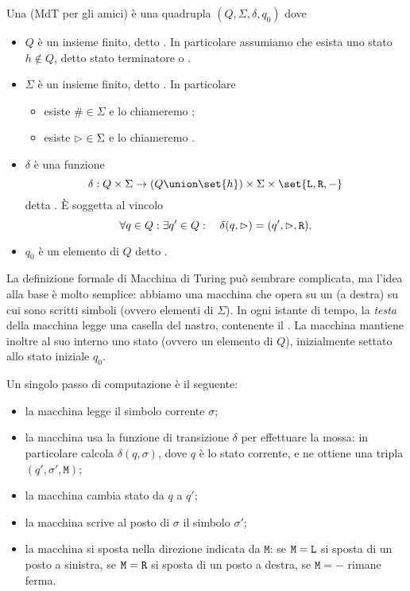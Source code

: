 \begin{definition}
    Una  (MdT per gli amici) è una quadrupla $(Q, \Sigma, \delta, q_0)$ dove
    \begin{itemize}
        \item $Q$ è un insieme finito, detto . In particolare assumiamo che esista uno stato $h \notin Q$, detto stato terminatore o .
        \item $\Sigma$ è un insieme finito, detto . In particolare \begin{itemize}
            \item esiste $\# \in \Sigma$ e lo chiameremo ;
            \item esiste ${\vartriangleright} \in \Sigma$ e lo chiameremo .
        \end{itemize}
        \item $\delta$ è una funzione \[
            \delta : Q \times \Sigma \to (Q \union \set{h}) \times \Sigma \times \set{\Left, \Right, -}
        \] detta . È soggetta al vincolo \[
            \forall q \in Q: \exists q' \in Q : \quad \delta(q, {\vartriangleright}) = (q', {\vartriangleright}, \texttt{R}).
        \]
        \item $q_0$ è un elemento di $Q$ detto .
    \end{itemize}
\end{definition}

La definizione formale di Macchina di Turing può sembrare complicata, ma l'idea alla base è molto semplice: 
abbiamo una macchina che opera su un  (a destra) su cui sono scritti simboli (ovvero elementi di $\Sigma$).
In ogni istante di tempo, la \emph{testa} della macchina legge una casella del nastro, contenente il . 
La macchina mantiene inoltre al suo interno uno stato (ovvero un elemento di $Q$), inizialmente settato allo stato iniziale $q_0$.

Un singolo passo di computazione è il seguente: \begin{itemize}
    \item la macchina legge il simbolo corrente $\sigma$;
    \item la macchina usa la funzione di transizione $\delta$ per effettuare la mossa: in particolare calcola $\delta(q, \sigma)$, dove $q$ è lo stato corrente, e ne ottiene una tripla $(q', \sigma', \texttt{M})$;
    \item la macchina cambia stato da $q$ a $q'$;
    \item la macchina scrive al posto di $\sigma$ il simbolo $\sigma'$;
    \item la macchina si sposta nella direzione indicata da $\texttt{M}$: se $\texttt{M} = \texttt{L}$ si sposta di un posto a sinistra, se $\texttt{M} = \texttt{R}$ si sposta di un posto a destra, se $\texttt{M} = -$ rimane ferma.           
\end{itemize}

